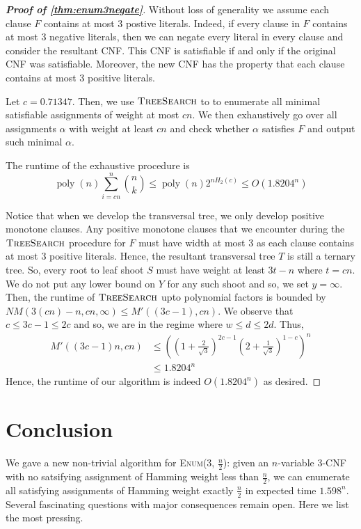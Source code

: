 \documentclass[10pt,a4paper]{article}
\newcommand{\poly}{\operatorname{poly}}
\newcommand{\openfunction}{Y}
\newcommand{\openinteger}{y}
\newcommand\enumballsat[2]{\textsc{Enum($#1$, $#2$)}}
\newcommand{\ts}{\textsc{TreeSearch}}
\begin{document}
\begin{proof}[\textbf{Proof of \cref{thm:enum3negate}}]
Without loss of generality we assume each clause $F$ contains at most $3$ postive literals. Indeed, if every clause in $F$ contains at most $3$ negative literals, then we can negate every literal in every clause and consider the resultant CNF. This CNF is satisfiable if and only if the original CNF was satisfiable. Moreover, the new CNF has the property that each clause contains at most $3$ positive literals.

Let $c = 0.71347$.
Then, we use $\ts$ to to enumerate all minimal satisfiable assignments of weight at most $cn$. We then exhaustively go over all assignments $\alpha$ with weight at least $cn$ and check whether $\alpha$ satisfies $F$ and output such minimal $\alpha$.

The runtime of the exhaustive procedure is
\[
	\poly(n)\sum_{i=cn}^n \binom{n}{k} \le \poly(n) 2^{n H_2(c)} \le O(1.8204^n)
\]

Notice that when we develop the transversal tree, we only develop positive monotone clauses. Any positive monotone clauses that we encounter during the $\ts$ procedure for $F$ must have width at most $3$ as each clause contains at most $3$ positive literals. Hence, the resultant transversal tree $T$ is still a ternary tree. So, every root to leaf shoot $S$ must have weight at least $3t - n$ where $t = cn$. We do not put any lower bound on $\openfunction$ for any such shoot and so, we set $\openinteger = \infty$. Then, the runtime of $\ts$ upto polynomial factors is bounded by $NM(3(cn) - n, cn, \infty) \le M'((3c-1), cn)$. We observe that $c\le 3c-1 \le 2c$ and so, we are in the regime where $w\le d\le 2d$. Thus, 
\begin{align*}
M'((3c-1)n, cn)
& \le \left(\left( 1 + \frac{2}{\sqrt{3}}\right)^{2c-1}\left(2 + \frac{1}{\sqrt{3}}\right)^{1-c}\right)^n\\
& \le 1.8204^n
\end{align*}
Hence, the runtime of our algorithm is indeed $O(1.8204^n)$ as desired.

\end{proof}

\section{Conclusion} \label{sec:conclusion}

We gave a new non-trivial algorithm for \enumballsat{3}{\frac{n}{2}}: given an $n$-variable 3-CNF with no satsifying assignment of Hamming weight less than $\frac{n}{2}$, we can enumerate all satisfying assignments of Hamming weight exactly $\frac{n}{2}$ in expected time $1.598^n$. Several fascinating questions with major consequences remain open. Here we list the most pressing.
\end{document}
